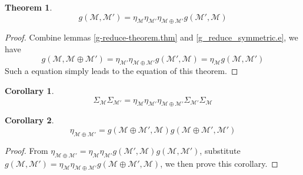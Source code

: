\documentclass[12font]{article}
\newtheorem{theorem}{Theorem}[section]
\theoremstyle{definition}
\newtheorem{corollary}{Corollary}[theorem]
\numberwithin{equation}{section}
\begin{document}
\begin{theorem}\label{g_exchange.e}
  \[
  g(\mathcal{M},\mathcal{M}') = \eta_{\mathcal{M}}\eta_{\mathcal{M}'}\eta_{\mathcal{M}\oplus\mathcal{M}'} g(\mathcal{M}',\mathcal{M}) 
  \]
\end{theorem}
\begin{proof}
  Combine lemmas \ref{g-reduce-theorem.thm} and \ref{g_reduce_symmetric.e}, we have
  \[
  g(\mathcal{M},\mathcal{M}\oplus\mathcal{M}') = 
  \eta_{\mathcal{M}'}\eta_{\mathcal{M}\oplus\mathcal{M}'} g(\mathcal{M}',\mathcal{M}) =
  \eta_{\mathcal{M}}g(\mathcal{M},\mathcal{M}')
  \]
  Such a equation simply leads to the equation of this theorem.
\end{proof}
\begin{corollary}
  \[
  \Sigma_{\mathcal{M}}\Sigma_{\mathcal{M}'} = \eta_{\mathcal{M}}\eta_{\mathcal{M}'}\eta_{\mathcal{M}\oplus\mathcal{M}'} 
  \Sigma_{\mathcal{M}'}\Sigma_{\mathcal{M}}
  \]
\end{corollary}
\begin{corollary}
  \[
  \eta_{\mathcal{M}\oplus\mathcal{M}'} = g(\mathcal{M}\oplus\mathcal{M}',\mathcal{M}) g(\mathcal{M}\oplus\mathcal{M}',\mathcal{M}')
  \]
\end{corollary}
\begin{proof}
  From 
  $
  \eta_{\mathcal{M}\oplus\mathcal{M}'} = \eta_{\mathcal{M}}\eta_{\mathcal{M}'} g(\mathcal{M}',\mathcal{M}) g(\mathcal{M},\mathcal{M}')
  $, 
  substitute $g(\mathcal{M},\mathcal{M}') = \eta_{\mathcal{M}} \eta_{\mathcal{M}\oplus\mathcal{M}'}g(\mathcal{M}\oplus\mathcal{M}',\mathcal{M})$, we then prove this corollary.
\end{proof}
\end{document}
